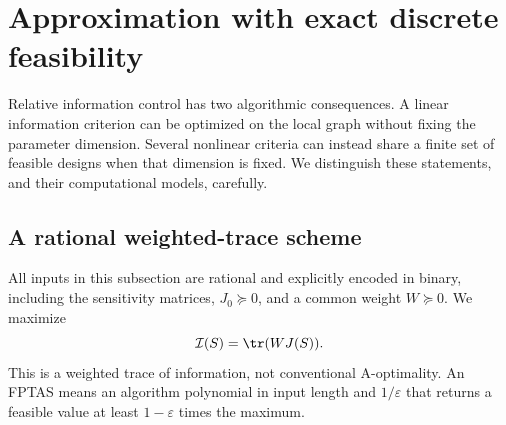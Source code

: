 \section{Approximation with exact discrete feasibility}
\label{sec:approximation}
Relative information control has two algorithmic consequences. A linear
information criterion can be optimized on the local graph without fixing the
parameter dimension. Several nonlinear criteria can instead share a finite
set of feasible designs when that dimension is fixed. We distinguish these
statements, and their computational models, carefully.

\subsection{A rational weighted-trace scheme}
\label{subsec:trace-scheme}
All inputs in this subsection are rational and explicitly encoded in binary,
including the sensitivity matrices, $J_0\succeq0$, and a common weight
$W\succeq0$. We maximize
\[
 \mathcal I(S)=\tr(WJ(S)).
\]
This is a weighted trace of information, not conventional A-optimality.
An FPTAS means an algorithm polynomial in input length and $1/\varepsilon$
that returns a feasible value at least $1-\varepsilon$ times the maximum.

